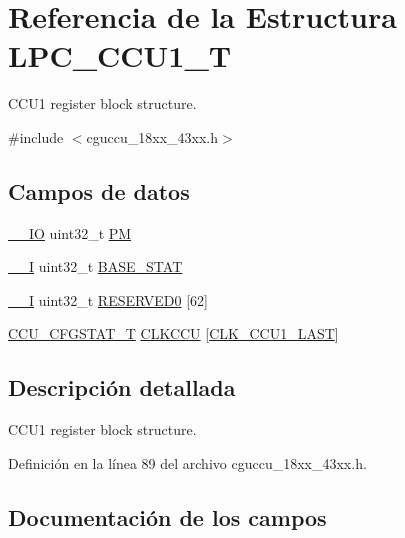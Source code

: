 \hypertarget{struct_l_p_c___c_c_u1___t}{}\section{Referencia de la Estructura L\+P\+C\+\_\+\+C\+C\+U1\+\_\+T}
\label{struct_l_p_c___c_c_u1___t}


C\+C\+U1 register block structure.  




{\ttfamily \#include $<$cguccu\+\_\+18xx\+\_\+43xx.\+h$>$}

\subsection*{Campos de datos}
\begin{DoxyCompactItemize}
\item 
\hyperlink{core__sc300_8h_aec43007d9998a0a0e01faede4133d6be}{\+\_\+\+\_\+\+IO} uint32\+\_\+t \hyperlink{struct_l_p_c___c_c_u1___t_a3d44c3611cd3eaefe7d7214409ef00b8}{PM}
\item 
\hyperlink{core__sc300_8h_af63697ed9952cc71e1225efe205f6cd3}{\+\_\+\+\_\+I} uint32\+\_\+t \hyperlink{struct_l_p_c___c_c_u1___t_aa450381b00ff7d07b6cb5fbcf761dfdc}{B\+A\+S\+E\+\_\+\+S\+T\+AT}
\item 
\hyperlink{core__sc300_8h_af63697ed9952cc71e1225efe205f6cd3}{\+\_\+\+\_\+I} uint32\+\_\+t \hyperlink{struct_l_p_c___c_c_u1___t_af715d3356c6e2bd831a1862864ef1a7e}{R\+E\+S\+E\+R\+V\+E\+D0} \mbox{[}62\mbox{]}
\item 
\hyperlink{struct_c_c_u___c_f_g_s_t_a_t___t}{C\+C\+U\+\_\+\+C\+F\+G\+S\+T\+A\+T\+\_\+T} \hyperlink{struct_l_p_c___c_c_u1___t_a9d5831b9a6d0d17d948eafe66b290dc1}{C\+L\+K\+C\+CU} \mbox{[}\hyperlink{chip__clocks_8h_a500a6084ba2d6361fa16b75205a8a513af43f3366ad619d1ac63ac44a6efc0343}{C\+L\+K\+\_\+\+C\+C\+U1\+\_\+\+L\+A\+ST}\mbox{]}
\end{DoxyCompactItemize}


\subsection{Descripción detallada}
C\+C\+U1 register block structure. 

Definición en la línea 89 del archivo cguccu\+\_\+18xx\+\_\+43xx.\+h.



\subsection{Documentación de los campos}
